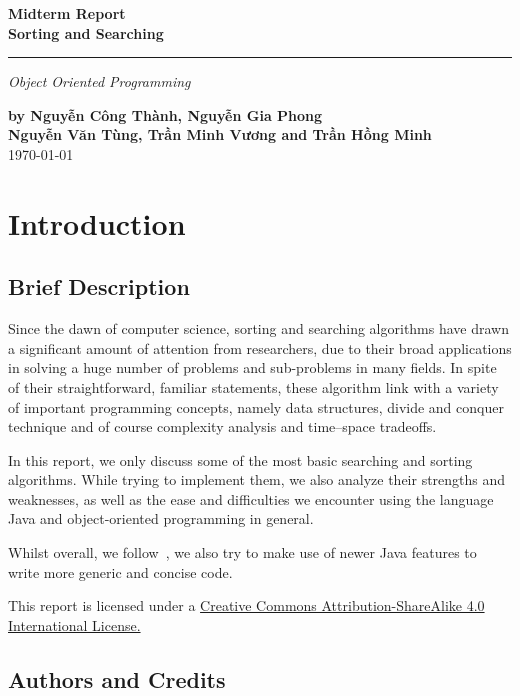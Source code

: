 \documentclass[a4paper,12pt]{article}
\begin{document}
\setcounter{page}{0}
\thispagestyle{empty}
\begin{flushright}
  \setlength{\baselineskip}{1.4\baselineskip}
\textbf{\Huge Midterm Report\\Sorting and Searching}
  \noindent\rule{\textwidth}{5pt}
  \emph{\Large Object Oriented Programming}

  \textbf{by Nguyễn Công Thành, Nguyễn Gia Phong\\
          Nguyễn Văn Tùng, Trần Minh Vương and Trần Hồng Minh\\}
  \today
\end{flushright}
\pagebreak

\tableofcontents
\pagebreak

\section{Introduction}
\subsection{Brief Description}
Since the dawn of computer science, sorting and searching algorithms
have drawn a significant amount of attention from researchers,
due to their broad applications in solving a huge number of problems
and sub-problems in many fields.  In spite of their straightforward, familiar
statements, these algorithm link with a variety of important programming
concepts, namely data structures, divide and conquer technique and of course
complexity analysis and time–space tradeoffs.

In this report, we only discuss some of the most basic searching
and sorting algorithms.  While trying to implement them, we also analyze
their strengths and weaknesses, as well as the ease and difficulties
we encounter using the language Java and object-oriented programming in general.

Whilst overall, we follow~\cite{wu}, we also try to make use of newer Java
features to write more generic and concise code.

This report is licensed under a
\href{http://creativecommons.org/licenses/by-sa/4.0/}{Creative Commons
Attribution-ShareAlike 4.0 International License.}

\subsection{Authors and Credits}
\end{document}
